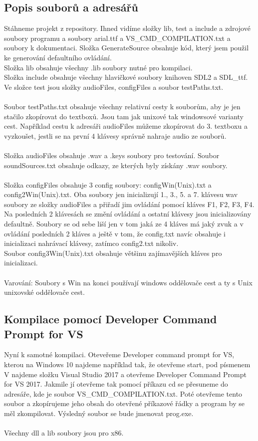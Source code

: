 \documentclass[12pt]{article}
\begin{document}
	\subsection{Popis souborů a adresářů}
	Stáhneme projekt z repository. Ihned vidíme složky lib, test a include a zdrojové soubory programu a soubory arial.ttf a VS\_CMD\_COMPILATION.txt a soubory k dokumentaci. Složka GenerateSource obsahuje kód, který jsem použil ke generování defaultního ovládání.
	\\
	Složka lib obsahuje všechny .lib soubory nutné pro kompilaci.
	\\
	Složka include obsahuje všechny hlavičkové soubory knihoven SDL2 a SDL\_ttf.
	\\
	Ve složce test jsou složky audioFiles, configFiles a soubor testPaths.txt.
	\\
	\\
	Soubor testPaths.txt obsahuje všechny relativní cesty k souborům, aby je jen stačilo zkopírovat do textboxů. Jsou tam jak unixové tak windowsové varianty cest. Například cestu k adresáři audioFiles můžeme zkopírovat do 3. textboxu a vyzkoušet, jestli se na první 4 klávesy správně nahraje audio ze souborů.
	\\
	\\
	Složka audioFiles obsahuje .wav a .keys soubory pro testování. Soubor soundSources.txt obsahuje odkazy, ze kterých byly získány .wav soubory.
	\\
	\\
	Složka configFiles obsahuje 3 config soubory: configWin(Unix).txt a config2Win(Unix).txt. Oba soubory jen inicializují 1., 3., 5. a 7. klávesu wav soubory ze složky audioFiles a přiřadí jim ovládání pomocí kláves F1, F2, F3, F4. Na posledních 2 klávesách se změní ovládání a ostatní klávesy jsou inicializovány defaultně. Soubory se od sebe liší jen v tom jaká ze 4 kláves má jaký zvuk a v ovládání posledních 2 kláves a ještě v tom, že config.txt navíc obsahuje i inicializaci nahrávací klávesy, zatímco config2.txt nikoliv.
	\\
	Soubor config3Win(Unix).txt obsahuje většinu zajímavějších kláves pro inicializaci.
	\\
	\\
	Varování: Soubory s Win na konci používají windows oddělovače cest a ty s Unix unixovské oddělovače cest.
	
	\newpage
	\subsection{Kompilace pomocí Developer Command Prompt for VS}
	Nyní k samotné kompilaci. Oteveřeme Developer command prompt for VS, kterou na Windows 10 najdeme například tak, že otevřeme start, pod písmenem V najdeme složku Visual Studio 2017 a otevřeme Developer Command Prompt for VS 2017. Jakmile jí otevřeme tak pomocí příkazu cd se přesuneme do adresáře, kde je soubor VS\_CMD\_COMPILATION.txt. Poté otevřeme tento soubor a zkopírujeme jeho obsah do otevřené příkazové řádky a program by se měl zkompilovat. Výsledný soubor se bude jmenovat prog.exe. 
	\\
	\\
	Všechny dll a lib soubory jsou pro x86.
	
\end{document}
